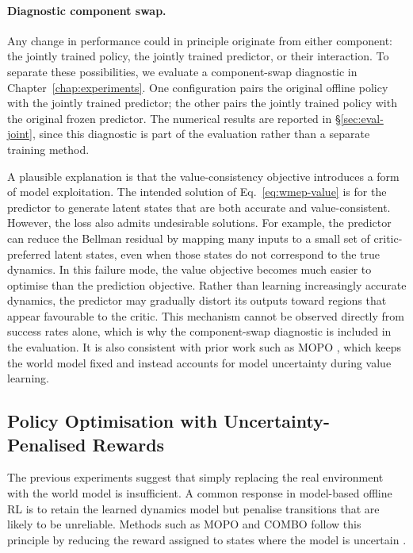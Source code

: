 \paragraph{Diagnostic component swap.}

Any change in performance could in principle originate from either component: the
jointly trained policy, the jointly trained predictor, or their
interaction. To separate these possibilities, we evaluate a
component-swap diagnostic in Chapter~\ref{chap:experiments}. One
configuration pairs the original offline policy with the jointly trained
predictor; the other pairs the jointly trained policy with the original
frozen predictor. The numerical results are reported in
\S\ref{sec:eval-joint}, since this diagnostic is part of the evaluation
rather than a separate training method.

A plausible explanation is that the value-consistency objective
introduces a form of model exploitation.
The intended solution of Eq.~\eqref{eq:wmep-value} is for the predictor
to generate latent states that are both accurate and value-consistent.
However, the loss also admits undesirable solutions. For example, the
predictor can reduce the Bellman residual by mapping many inputs to a
small set of critic-preferred latent states, even when those states do
not correspond to the true dynamics.
In this failure mode, the value objective becomes much easier to optimise than
the prediction objective. Rather than learning increasingly accurate
dynamics, the predictor may gradually distort its outputs toward
regions that appear favourable to the critic.
This mechanism cannot be observed directly from success rates alone, which is why
the component-swap diagnostic is included in the evaluation. It is also consistent
with prior work such as MOPO \cite{yu2020mopomodelbasedofflinepolicy}, which keeps
the world model fixed and instead accounts for model uncertainty during value
learning.

\subsection{Policy Optimisation with Uncertainty-Penalised Rewards}
\label{sec:wmep-exp45}

The previous experiments suggest that simply replacing the real
environment with the world model is insufficient. A common response in
model-based offline RL is to retain the learned dynamics model but
penalise transitions that are likely to be unreliable. Methods such as
MOPO and COMBO follow this principle by reducing the reward assigned to
states where the model is uncertain
\cite{yu2020mopomodelbasedofflinepolicy,yu2021combo}.

